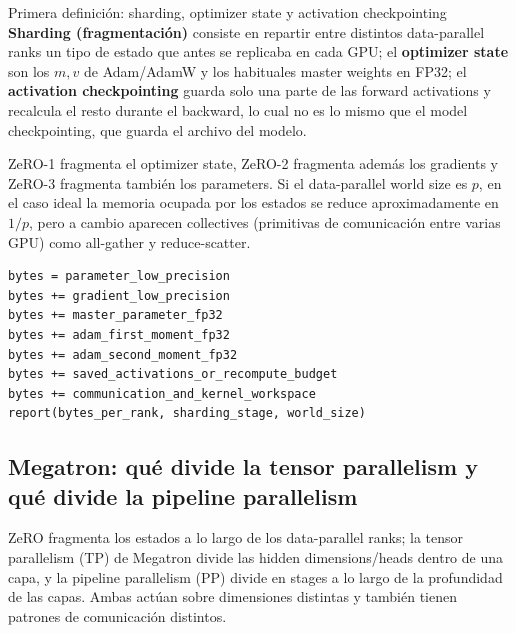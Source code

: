 
\begin{importantbox}{Primera definición: sharding, optimizer state y activation checkpointing}
\textbf{Sharding (fragmentación)} consiste en repartir entre distintos data-parallel ranks un tipo de estado que antes se replicaba en cada GPU; el \textbf{optimizer state} son los $m,v$ de Adam/AdamW y los habituales master weights en FP32; el \textbf{activation checkpointing} guarda solo una parte de las forward activations y recalcula el resto durante el backward, lo cual no es lo mismo que el model checkpointing, que guarda el archivo del modelo.
\end{importantbox}

ZeRO-1 fragmenta el optimizer state, ZeRO-2 fragmenta además los gradients y ZeRO-3 fragmenta también los parameters. Si el data-parallel world size es $p$, en el caso ideal la memoria ocupada por los estados se reduce aproximadamente en $1/p$, pero a cambio aparecen collectives (primitivas de comunicación entre varias GPU) como all-gather y reduce-scatter.

\begin{lstlisting}[caption={Lista de cálculo de memoria de GPU para entrenamiento en precisión mixta}]
bytes = parameter_low_precision
bytes += gradient_low_precision
bytes += master_parameter_fp32
bytes += adam_first_moment_fp32
bytes += adam_second_moment_fp32
bytes += saved_activations_or_recompute_budget
bytes += communication_and_kernel_workspace
report(bytes_per_rank, sharding_stage, world_size)
\end{lstlisting}


\subsection{Megatron: qué divide la tensor parallelism y qué divide la pipeline parallelism}

ZeRO fragmenta los estados a lo largo de los data-parallel ranks; la tensor parallelism (TP) de Megatron divide las hidden dimensions/heads dentro de una capa, y la pipeline parallelism (PP) divide en stages a lo largo de la profundidad de las capas. Ambas actúan sobre dimensiones distintas y también tienen patrones de comunicación distintos.

